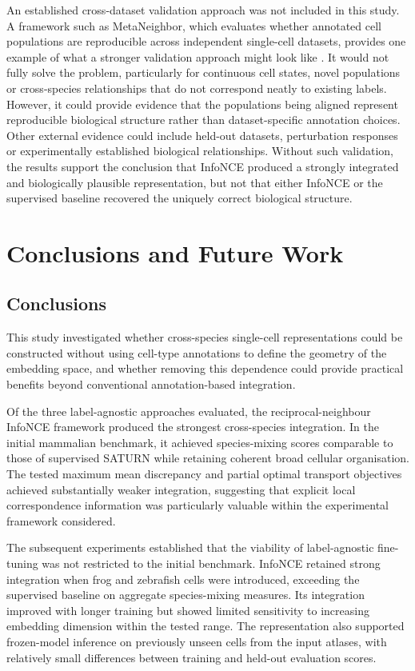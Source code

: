 \documentclass{article}
\begin{document}
An established cross-dataset validation approach was not included in this study. A framework such as MetaNeighbor, which evaluates whether annotated cell populations are reproducible across independent single-cell datasets, provides one example of what a stronger validation approach might look like \cite{MetaNeighbour}. It would not fully solve the problem, particularly for continuous cell states, novel populations or cross-species relationships that do not correspond neatly to existing labels. However, it could provide evidence that the populations being aligned represent reproducible biological structure rather than dataset-specific annotation choices. Other external evidence could include held-out datasets, perturbation responses or experimentally established biological relationships. Without such validation, the results support the conclusion that InfoNCE produced a strongly integrated and biologically plausible representation, but not that either InfoNCE or the supervised baseline recovered the uniquely correct biological structure.

\section{Conclusions and Future Work}
\subsection{Conclusions}
This study investigated whether cross-species single-cell representations could be constructed without using cell-type annotations to define the geometry of the embedding space, and whether removing this dependence could provide practical benefits beyond conventional annotation-based integration.

Of the three label-agnostic approaches evaluated, the reciprocal-neighbour InfoNCE framework produced the strongest cross-species integration. In the initial mammalian benchmark, it achieved species-mixing scores comparable to those of supervised SATURN while retaining coherent broad cellular organisation. The tested maximum mean discrepancy and partial optimal transport objectives achieved substantially weaker integration, suggesting that explicit local correspondence information was particularly valuable within the experimental framework considered.

The subsequent experiments established that the viability of label-agnostic fine-tuning was not restricted to the initial benchmark. InfoNCE retained strong integration when frog and zebrafish cells were introduced, exceeding the supervised baseline on aggregate species-mixing measures. Its integration improved with longer training but showed limited sensitivity to increasing embedding dimension within the tested range. The representation also supported frozen-model inference on previously unseen cells from the input atlases, with relatively small differences between training and held-out evaluation scores.
\end{document}
